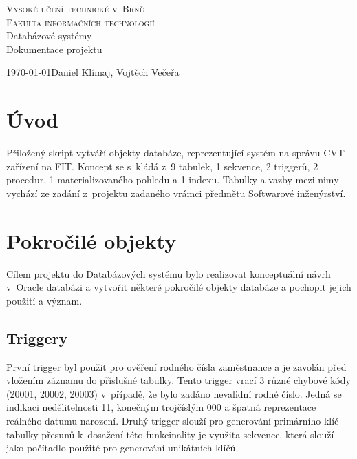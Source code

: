 \documentclass[11pt,a4paper,onecolumn]{article}
\begin{document}
\begin{titlepage}
  \begin{center}

    \textsc{\Huge Vysoké učení technické v~Brně\\\huge Fakulta informačních technologií}\\
    \LARGE Databázové systémy\\\Huge
    Dokumentace projektu\\
  \end{center}
  {\Large\today\hfill Daniel Klímaj, Vojtěch Večeřa }
\end{titlepage}
\section{Úvod}
Přiložený skript vytváří objekty databáze, reprezentující systém na správu CVT zařízení na FIT. Koncept se s~kládá z~9 tabulek, 1 sekvence, 2 triggerů, 2 procedur, 1 materializovaného pohledu a 1 indexu. Tabulky a vazby mezi nimy vychází ze zadání z~projektu zadaného vrámci předmětu Softwarové inženýrství. 

\section{Pokročilé objekty}
Cílem projektu do Databázových systému bylo realizovat konceptuální návrh v~Oracle databázi a vytvořit některé pokročilé objekty databáze a pochopit jejich použití a význam. 
\subsection{Triggery}
První trigger byl použit pro ověření rodného čísla zaměstnance a je zavolán před vložením záznamu do příslušné tabulky. Tento trigger vrací 3 různé chybové kódy (20001, 20002, 20003) v~případě, že bylo zadáno nevalidní rodné číslo. Jedná se indikaci nedělitelnosti 11, konečným trojčíslým 000 a špatná reprezentace reálného datumu narození. Druhý trigger slouží pro generování primárního klíč tabulky přesunů k~dosažení této funkcinality je využita sekvence, která slouží jako počítadlo použité pro generování unikátních klíčů.
\end{document}
